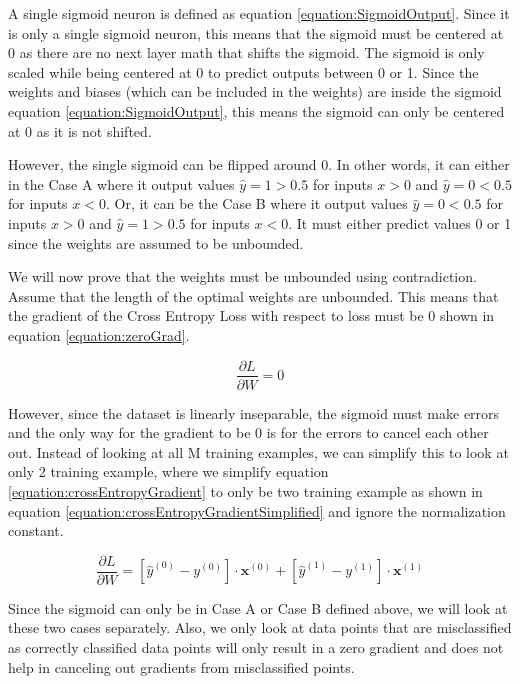 \documentclass[a4paper,12pt]{article}
\begin{document}
A single sigmoid neuron is defined as equation \ref{equation:SigmoidOutput}. Since it is only a single sigmoid neuron, this means that the sigmoid must be centered at 0 as there are no next layer math that shifts the sigmoid. The sigmoid is only scaled while being centered at 0 to predict outputs between 0 or 1. Since the weights and biases (which can be included in the weights) are inside the sigmoid equation \ref{equation:SigmoidOutput}, this means the sigmoid can only be centered at 0 as it is not shifted. 

However, the single sigmoid can be flipped around 0. In other words, it can either in the Case A where it output values $\hat{y} = 1 > 0.5$ for inputs $x>0$ and $\hat{y} = 0 < 0.5$ for inputs $x<0$. 
Or, it can be the Case B  where it output values $\hat{y} = 0 < 0.5$ for inputs $x>0$ and $\hat{y} = 1 >0.5$ for inputs $x < 0$. It must either predict values 0 or 1 since the weights are assumed to be unbounded. 

We will now prove that the weights must be unbounded using contradiction. 
Assume that the length of the optimal weights are unbounded. This means that the gradient of the Cross Entropy Loss  with respect to loss must be 0 shown in equation \ref{equation:zeroGrad}.

\begin{equation}
\label{equation:zeroGrad}
\frac{\partial L}{\partial W} = 0 
\end{equation}

However, since the dataset is linearly inseparable, the sigmoid must make errors and the only way for the gradient to be 0 is for the errors to cancel each other out. Instead of looking at all M training examples, we can simplify this to look at only 2 training example, where we simplify equation \ref{equation:crossEntropyGradient} to only be two training example as shown in equation 
\ref{equation:crossEntropyGradientSimplified} and ignore the normalization constant. 

\begin{equation}
\label{equation:crossEntropyGradientSimplified}
\frac{\partial L}{\partial W} = [ \hat{y}^{(0)} - y^{(0)} ] \cdot \mathbf{x}^{(0)} + [\hat{y}^{(1)} - y^{(1)} ] \cdot \mathbf{x}^{(1)} 
\end{equation}

Since the sigmoid can only be in Case A or Case B defined above, we will look at these two cases separately. Also, we only look at data points that are misclassified as correctly classified data points will only result in a zero gradient and does not help in canceling out gradients from misclassified points. 
\end{document}
